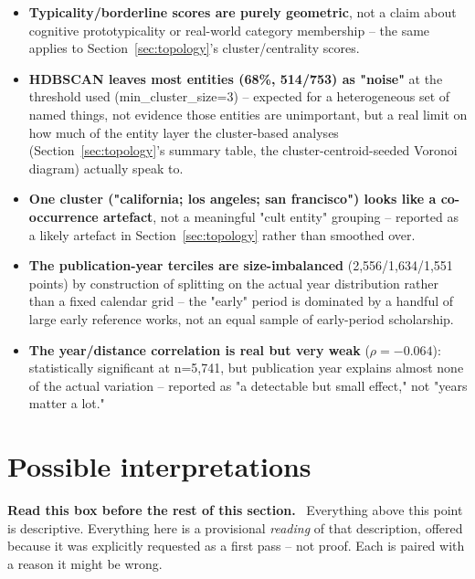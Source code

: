 \documentclass[11pt,a4paper]{article}
\newenvironment{plainbox}[1][Note]
  {\par\vspace{6pt}\noindent{\color{noteline}\rule{\linewidth}{0.6pt}}\par\vspace{3pt}
   \noindent\small\textbf{#1.}\ \ignorespaces}
  {\par\vspace{3pt}\noindent{\color{noteline}\rule{\linewidth}{0.6pt}}\vspace{6pt}\par}
\begin{document}
\begin{itemize}[leftmargin=1.4em]
  underlying high-dimensional retrieval this document relies on elsewhere.
  \item \textbf{Typicality/borderline scores are purely geometric}, not
  a claim about cognitive prototypicality or real-world category
  membership -- the same applies to Section~\ref{sec:topology}'s
  cluster/centrality scores.
  \item \textbf{HDBSCAN leaves most entities (68\%, 514/753) as "noise"}
  at the threshold used (min\_cluster\_size=3) -- expected for a
  heterogeneous set of named things, not evidence those entities are
  unimportant, but a real limit on how much of the entity layer the
  cluster-based analyses (Section~\ref{sec:topology}'s summary table,
  the cluster-centroid-seeded Voronoi diagram) actually speak to.
  \item \textbf{One cluster ("california; los angeles; san francisco")
  looks like a co-occurrence artefact}, not a meaningful "cult entity"
  grouping -- reported as a likely artefact in Section~\ref{sec:topology}
  rather than smoothed over.
  \item \textbf{The publication-year terciles are size-imbalanced}
  (2,556/1,634/1,551 points) by construction of splitting on the actual
  year distribution rather than a fixed calendar grid -- the "early"
  period is dominated by a handful of large early reference works, not an
  equal sample of early-period scholarship.
  \item \textbf{The year/distance correlation is real but very weak}
  ($\rho=-0.064$): statistically significant at n=5,741, but publication
  year explains almost none of the actual variation -- reported as "a
  detectable but small effect," not "years matter a lot."
\end{itemize}

\section{Possible interpretations}
\label{sec:interpretation}

\begin{plainbox}[Read this box before the rest of this section]
Everything above this point is descriptive. Everything here is a
provisional \emph{reading} of that description, offered because it was
explicitly requested as a first pass -- not proof. Each is paired with a
reason it might be wrong.
\end{plainbox}
\end{document}
